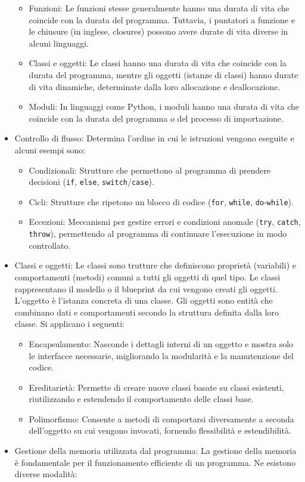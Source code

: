 \documentclass[
  letterpaper,
  DIV=11,
  numbers=noendperiod]{scrreprt}
\providecommand{\tightlist}{%
  \setlength{\itemsep}{0pt}\setlength{\parskip}{0pt}}\usepackage{longtable,booktabs,array}
\begin{document}
\begin{itemize}
  \begin{itemize}
  \tightlist
  \item
    Funzioni: Le funzioni stesse generalmente hanno una durata di vita
    che coincide con la durata del programma. Tuttavia, i puntatori a
    funzione e le chiusure (in inglese, closures) possono avere durate
    di vita diverse in alcuni linguaggi.
  \item
    Classi e oggetti: Le classi hanno una durata di vita che coincide
    con la durata del programma, mentre gli oggetti (istanze di classi)
    hanno durate di vita dinamiche, determinate dalla loro allocazione e
    deallocazione.
  \item
    Moduli: In linguaggi come Python, i moduli hanno una durata di vita
    che coincide con la durata del programma o del processo di
    importazione.
  \end{itemize}
\item
  Controllo di flusso: Determina l'ordine in cui le istruzioni vengono
  eseguite e alcuni esempi sono:

  \begin{itemize}
  \tightlist
  \item
    Condizionali: Strutture che permettono al programma di prendere
    decisioni (\texttt{if}, \texttt{else},
    \texttt{switch}/\texttt{case}).
  \item
    Cicli: Strutture che ripetono un blocco di codice (\texttt{for},
    \texttt{while}, \texttt{do}-\texttt{while}).
  \item
    Eccezioni: Meccanismi per gestire errori e condizioni anomale
    (\texttt{try}, \texttt{catch}, \texttt{throw}), permettendo al
    programma di continuare l'esecuzione in modo controllato.
  \end{itemize}
\item
  Classi e oggetti: Le classi sono trutture che definiscono proprietà
  (variabili) e comportamenti (metodi) comuni a tutti gli oggetti di
  quel tipo. Le classi rappresentano il modello o il blueprint da cui
  vengono creati gli oggetti. L'oggetto è l'istanza concreta di una
  classe. Gli oggetti sono entità che combinano dati e comportamenti
  secondo la struttura definita dalla loro classe. Si applicano i
  seguenti:

  \begin{itemize}
  \tightlist
  \item
    Encapsulamento: Nasconde i dettagli interni di un oggetto e mostra
    solo le interfacce necessarie, migliorando la modularità e la
    manutenzione del codice.
  \item
    Ereditarietà: Permette di creare nuove classi basate su classi
    esistenti, riutilizzando e estendendo il comportamento delle classi
    base.
  \item
    Polimorfismo: Consente a metodi di comportarsi diversamente a
    seconda dell'oggetto su cui vengono invocati, fornendo flessibilità
    e estendibilità.
  \end{itemize}
\item
  Gestione della memoria utilizzata dal programma: La gestione della
  memoria è fondamentale per il funzionamento efficiente di un
  programma. Ne esistono diverse modalità:


\end{itemize}
\end{document}
